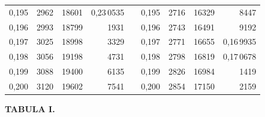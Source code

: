 \begin{tabular}{|c|c|c|r|@{}p{9pt}@{}|c|c|c|r|}
0,195 & 2962 & 18601 & 0,23\,0535 &  & 0,195 & 2716 & 16329 & 8447 \\[3pt]
0,196 & 2993 & 18799 & 1931 &  & 0,196 & 2743 & 16491 & 9192 \\
0,197 & 3025 & 18998 & 3329 &  & 0,197 & 2771 & 16655 & 0,16\,9935 \\
0,198 & 3056 & 19198 & 4731 &  & 0,198 & 2798 & 16819 & 0,17\,0678 \\
0,199 & 3088 & 19400 & 6135 &  & 0,199 & 2826 & 16984 & 1419 \\
0,200 & 3120 & 19602 & 7541 &  & 0,200 & 2854 & 17150 & 2159 \\
\hline
\end{tabular}\par
\endgroup
\clearpage
{}
\begingroup
\centering
\fontsize{9}{9}\selectfont
\setlength{\tabcolsep}{6pt}
\renewcommand{\arraystretch}{1}
\setlength{\parskip}{0pt}
\textbf{TABULA I.}
\par\vspace{7pt}

